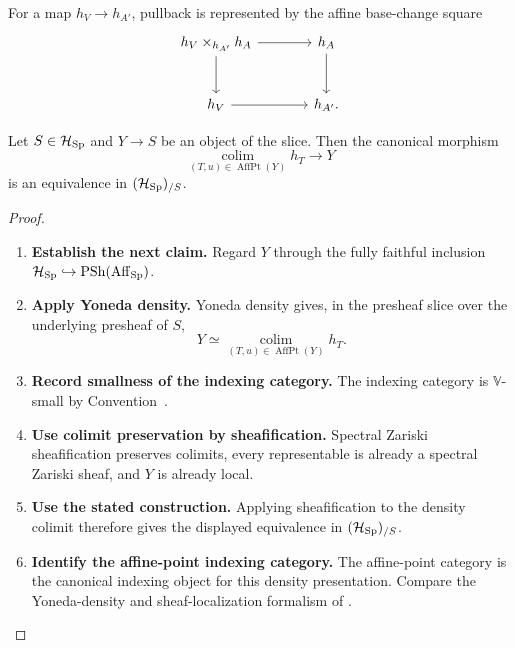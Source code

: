 For a map \(h_V\to h_{A'}\), pullback is represented by the affine base-change
square
\[
\begin{tikzcd}[column sep=large,row sep=large]
  h_V\times_{h_{A'}}h_A
    \arrow[r]
    \arrow[d]
  &
  h_A
    \arrow[d]
  \\
  h_V
    \arrow[r]
  &
  h_{A'}.
\end{tikzcd}
\]

\begin{lemma}
\label{lem:de-Rham-affine-density}
Let \(S\in\mathcal H_{\operatorname{Sp}}\) and \(Y\to S\) be an object of the slice.
Then the canonical morphism
\[
  \operatorname*{colim}_{(T,u)\in\operatorname{AffPt}(Y)}h_T
  \longrightarrow Y
\]
is an equivalence in \((\mathcal H_{\operatorname{Sp}})_{/S}\).
\end{lemma}

\begin{proof}
\leavevmode
\begin{enumerate}[label=\textup{(\arabic*)}]
    \item \textbf{Establish the next claim.}
    Regard \(Y\) through the fully faithful inclusion
    \(\mathcal H_{\operatorname{Sp}}\hookrightarrow\operatorname{PSh}(\operatorname{Aff}_{\operatorname{Sp}})\).
    \item \textbf{Apply Yoneda density.}
    Yoneda density gives, in the presheaf slice over the
    underlying presheaf of \(S\),
    \[
    Y
    \simeq
    \operatorname*{colim}_{(T,u)\in\operatorname{AffPt}(Y)}h_T.
    \]
    \item \textbf{Record smallness of the indexing category.}
    The indexing category is \(\mathbb V\)-small by
    Convention~.
    \item \textbf{Use colimit preservation by sheafification.}
    Spectral Zariski sheafification
    preserves colimits, every representable is already a spectral Zariski sheaf,
    and \(Y\) is already local.
    \item \textbf{Use the stated construction.}
    Applying sheafification to the density colimit
    therefore gives the displayed equivalence in
    \((\mathcal H_{\operatorname{Sp}})_{/S}\).
    \item \textbf{Identify the affine-point indexing category.}
    The affine-point category is the canonical
    indexing object for this density presentation.
    Compare
    the Yoneda-density and sheaf-localization formalism of
    \cite{LurieHigherToposTheory}.
\end{enumerate}
\end{proof}

